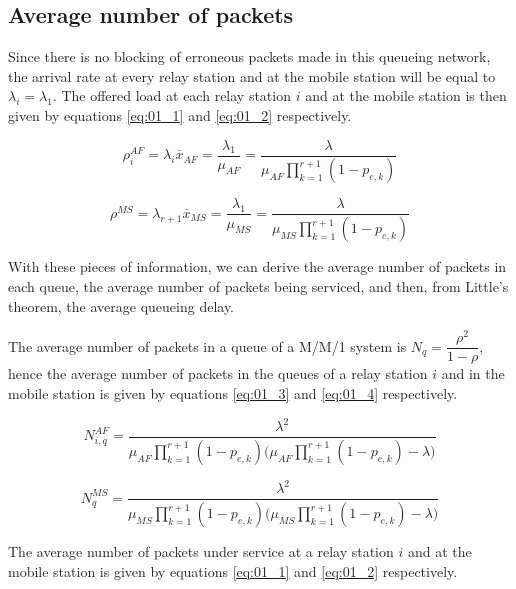 \subsection{Average number of packets}

Since there is no blocking of erroneous packets made in this queueing network,
the arrival rate at every relay station and at the mobile station will be equal
to $\lambda_i = \lambda_1$. The offered load at each relay station $i$ and at
the mobile station is then given by equations \ref{eq:01_1} and \ref{eq:01_2}
respectively.

\begin{equation}
  \rho_i^{AF} = \lambda_i \overline{x}_{AF} = \dfrac{\lambda_1}{\mu_{AF}} = \dfrac{\lambda}{\mu_{AF}\prod\limits_{k=1}^{r+1} (1 - p_{e,k})}
  \label{eq:01_1}
\end{equation}

\begin{equation}
  \rho^{MS} = \lambda_{r+1} \overline{x}_{MS} = \dfrac{\lambda_1}{\mu_{MS}} = \dfrac{\lambda}{\mu_{MS}\prod\limits_{k=1}^{r+1} (1 - p_{e,k})}
  \label{eq:01_2}
\end{equation}

With these pieces of information, we can derive the average number of packets
in each queue, the average number of packets being serviced, and then, from
Little's theorem, the average queueing delay.


The average number of packets in a queue of a M/M/1 system is
$N_q = \dfrac{\rho^2}{1-\rho}$, hence the average number of packets in the queues
of a relay station $i$ and in the mobile station is given by equations
\ref{eq:01_3} and \ref{eq:01_4} respectively.

\begin{equation}
  N_{i,q}^{AF} = \dfrac{\lambda^2}{\mu_{AF} \prod\limits_{k=1}^{r+1} (1 - p_{e,k})\Big(\mu_{AF}\prod\limits_{k=1}^{r+1} (1 - p_{e,k}) - \lambda\Big)}
  \label{eq:01_3}
\end{equation}

\begin{equation}
  N_q^{MS} = \dfrac{\lambda^2}{\mu_{MS} \prod\limits_{k=1}^{r+1} (1 - p_{e,k})\Big(\mu_{MS}\prod\limits_{k=1}^{r+1} (1 - p_{e,k}) - \lambda\Big)}
  \label{eq:01_4}
\end{equation}

The average number of packets under service at a relay station $i$ and at the
mobile station is given by equations \ref{eq:01_1} and \ref{eq:01_2} respectively.


